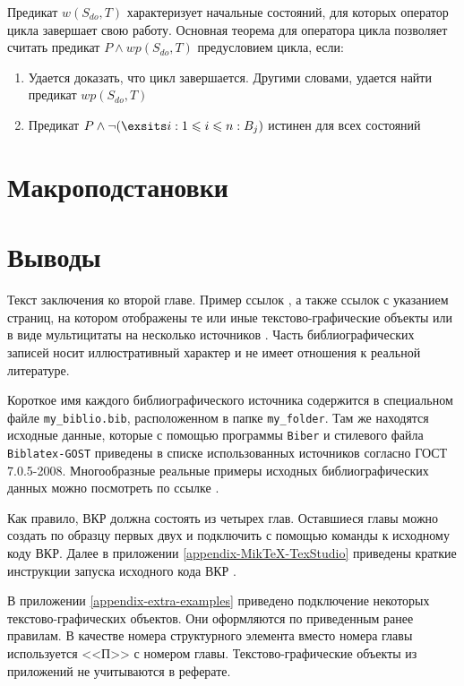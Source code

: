 Предикат $w(S_{do}, T)$ характеризует начальные состояний, для которых оператор цикла завершает свою работу.
Основная теорема для оператора цикла позволяет считать предикат $P \wedge wp(S_{do}, T)$ предусловием цикла, если:
\begin{enumerate}
	\item Удается доказать, что цикл завершается. Другими словами, удается найти предикат $wp(S_{do}, T)$
	\item Предикат $P \wedge \neg (\exsits i: 1 \leq i \leq n: B_j)$ истинен для всех состояний
\end{enumerate}

\section{Макроподстановки}

\section{Выводы} \label{ch2:conclusion}
Текст заключения ко второй главе. Пример ссылок \cite{Article,Book,Booklet,Conference,Inbook,Incollection,Manual,Mastersthesis,Misc,Phdthesis,Proceedings,Techreport,Unpublished,badiou:briefings}, а также ссылок с указанием страниц, на котором отображены те или иные текстово-графические объекты  \cite[с.~96]{Naidenova2017} или в виде мультицитаты на несколько источников \cites[с.~96]{Naidenova2017}[с.~46]{Ganter1999}. Часть библиографических записей носит иллюстративный характер и не имеет отношения к реальной литературе. 

Короткое имя каждого библиографического источника содержится в специальном файле \verb|my_biblio.bib|, расположенном в папке \verb|my_folder|. Там же находятся исходные данные, которые с помощью программы \texttt{Biber} и стилевого файла \texttt{Biblatex-GOST} \cite{ctan-biblatex-gost} приведены в списке использованных источников согласно ГОСТ 7.0.5-2008.
Многообразные реальные примеры исходных библиографических данных можно посмотреть по ссылке \cite{ctan-biblatex-gost-examples}.

Как правило, ВКР должна состоять из четырех глав. Оставшиеся главы можно создать по образцу первых двух и подключить с помощью команды \verb|| к исходному коду ВКР. Далее в приложении \ref{appendix-MikTeX-TexStudio} приведены краткие инструкции запуска исходного кода ВКР \cite{latex-miktex,latex-texstudio}.

В приложении \ref{appendix-extra-examples} приведено подключение некоторых текстово-графических объектов. Они оформляются по приведенным ранее правилам. В качестве номера структурного элемента вместо номера главы используется <<П>> с номером главы. Текстово-графические объекты из приложений не учитываются в реферате.



%

